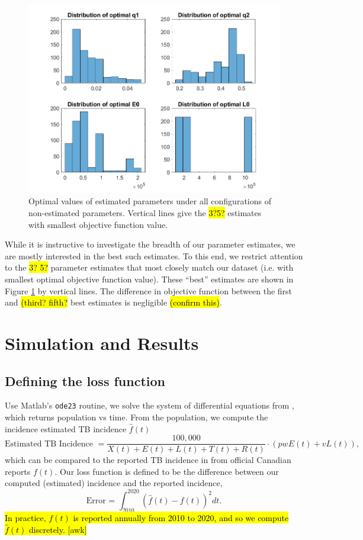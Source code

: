 \documentclass[sn-mathphys,Numbered]{sn-jnl}%
\theoremstyle{thmstyleone}%
\theoremstyle{thmstyletwo}%
\theoremstyle{thmstylethree}%
\begin{document}
\begin{figure}
    \centering
    \includegraphics{Optimized parameter distribution across sensitivity analysis.png}
    \caption{Optimal values of estimated parameters under all configurations of non-estimated parameters. Vertical lines give the \hl{3?5?} estimates with smallest objective function value.}
    \label{fig:est_dist}
\end{figure}





While it is instructive to investigate the breadth of our parameter estimates, we are mostly interested in the best such estimates. To this end, we restrict attention to the \hl{3? 5?} parameter estimates that most closely match our dataset (i.e. with smallest optimal objective function value). These ``best'' estimates are shown in Figure \ref{fig:est_dist} by vertical lines. The difference in objective function between the first and \hl{(third? fifth?} best estimates is negligible \hl{(confirm this)}.


\section{Simulation and Results}\label{sec4}

\subsection{Defining the loss function}

Use Matlab's \texttt{ode23} routine, we solve the system of differential equations from \cite{Guo2011PersistentLatency}, which returns population vs time.  From the population, we compute the incidence estimated TB incidence $\hat{f}(t)$
  	$$\text{Estimated TB Incidence } = \frac{100,000}{X(t)+E(t)+L(t)+T(t)+R(t)} \cdot (pw E(t) + v L(t)) ,$$
which can be compared to the reported TB incidence in from official Canadian reports $f(t)$\cite{MounchiliA.2022TuberculosisReport}.  Our loss function is defined to be the difference between our computed (estimated) incidence and the reported incidence,
 $$ \text{Error = } \int_{2010}^{2020} (\hat{f}(t) - f(t))^2 dt. $$
\hl{In practice, $f(t)$ is reported annually from 2010 to 2020, and so we compute $\hat{f}(t)$ discretely. [awk]} 
\end{document}
